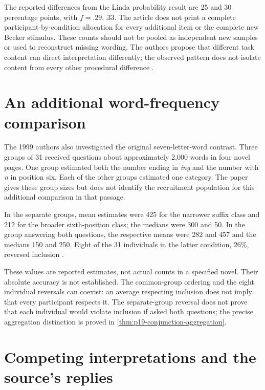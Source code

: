 The reported differences from the Linda probability result are
25 and 30 percentage points, with \(f=.29,.33\).
The article does not print a complete participant-by-condition
allocation for every additional item or the complete new
Becker stimulus. These counts should not be pooled as independent
new samples or used to reconstruct missing wording.
The authors propose that different task content can direct
interpretation differently; the observed pattern does not isolate
content from every other procedural difference
\cite[p.~299 and p.~289 n.~6]{HertwigGigerenzer1999Conjunction}.

\section{An additional word-frequency comparison}
\label{sec:p19-conjunction-language-words}

The 1999 authors also investigated the original seven-letter-word
contrast. Three groups of 31 received questions about approximately
2,000 words in four novel pages. One group estimated both the
number ending in \emph{ing} and the number with \emph{n} in
position six. Each of the other groups estimated one category.
The paper gives these group sizes but does not identify the
recruitment population for this additional comparison in that passage.

In the separate groups, mean estimates were 425 for the narrower
suffix class and 212 for the broader sixth-position class;
the medians were 300 and 50. In the group answering both
questions, the respective means were 282 and 457 and the
medians 150 and 250. Eight of the 31 individuals in the latter
condition, 26\%, reversed inclusion
\cite[pp.~295--296]{HertwigGigerenzer1999Conjunction}.

These values are reported estimates, not actual counts in a
specified novel. Their absolute accuracy is not established.
The common-group ordering and the eight individual reversals
can coexist: an average respecting inclusion does not imply
that every participant respects it.
The separate-group reversal does not prove that each individual
would violate inclusion if asked both questions; the precise
aggregation distinction is proved in
\cref{thm:p19-conjunction-aggregation}.

\section{Competing interpretations and the source's replies}
\label{sec:p19-conjunction-language-objections}

